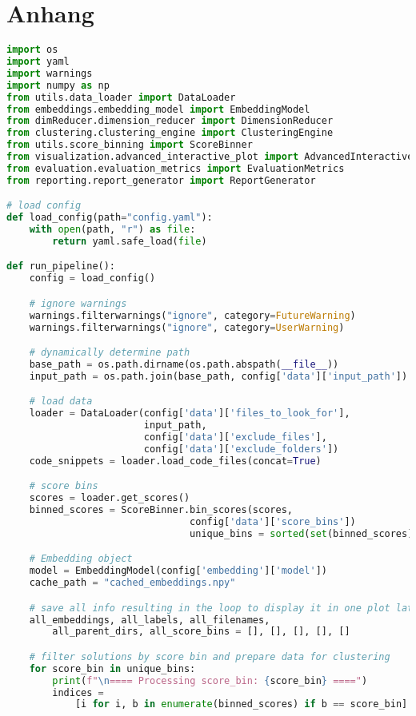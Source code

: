 \chapter{Anhang}

\begin{lstlisting}[language=Python, caption={Pipeline}, label={prco:Pipel}]
import os
import yaml
import warnings
import numpy as np
from utils.data_loader import DataLoader
from embeddings.embedding_model import EmbeddingModel
from dimReducer.dimension_reducer import DimensionReducer
from clustering.clustering_engine import ClusteringEngine
from utils.score_binning import ScoreBinner
from visualization.advanced_interactive_plot import AdvancedInteractivePlot
from evaluation.evaluation_metrics import EvaluationMetrics
from reporting.report_generator import ReportGenerator

# load config
def load_config(path="config.yaml"):
    with open(path, "r") as file:
        return yaml.safe_load(file)

def run_pipeline():
    config = load_config()

    # ignore warnings
    warnings.filterwarnings("ignore", category=FutureWarning)
    warnings.filterwarnings("ignore", category=UserWarning)

    # dynamically determine path
    base_path = os.path.dirname(os.path.abspath(__file__))
    input_path = os.path.join(base_path, config['data']['input_path'])

    # load data
    loader = DataLoader(config['data']['files_to_look_for'],
                        input_path,
                        config['data']['exclude_files'],
                        config['data']['exclude_folders'])
    code_snippets = loader.load_code_files(concat=True)

    # score bins
    scores = loader.get_scores()
    binned_scores = ScoreBinner.bin_scores(scores,
                                config['data']['score_bins'])
                                unique_bins = sorted(set(binned_scores))

    # Embedding object
    model = EmbeddingModel(config['embedding']['model'])
    cache_path = "cached_embeddings.npy"

    # save all info resulting in the loop to display it in one plot later
    all_embeddings, all_labels, all_filenames,
        all_parent_dirs, all_score_bins = [], [], [], [], []

    # filter solutions by score bin and prepare data for clustering
    for score_bin in unique_bins:
        print(f"\n==== Processing score_bin: {score_bin} ====")
        indices =
            [i for i, b in enumerate(binned_scores) if b == score_bin]


\end{lstlisting}

